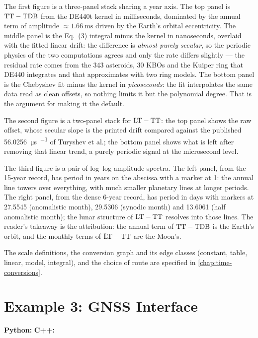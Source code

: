 The first figure is a three-panel stack sharing a year axis. The top panel is
$\mathrm{TT}-\mathrm{TDB}$ from the DE440t kernel in milliseconds, dominated by the annual term
of amplitude $\approx\SI{1.66}{\milli\second}$ driven by the Earth's orbital
eccentricity. The middle panel is the Eq.~(3) integral minus the kernel in
nanoseconds, overlaid with the fitted linear drift: the difference is
\emph{almost purely secular}, so the periodic physics of the two computations
agrees and only the rate differs slightly --- the residual rate comes from the
343 asteroids, 30 KBOs and the Kuiper ring that DE440 integrates and that
\lupnt{} approximates with two ring models. The bottom panel is the Chebyshev fit
minus the kernel in \emph{picoseconds}: the fit interpolates the same data read
as clean offsets, so nothing limits it but the polynomial degree. That is the
argument for making it the default.

The second figure is a two-panel stack for $\mathrm{LT}-\mathrm{TT}$: the top panel shows the
raw offset, whose secular slope is the printed drift compared against the
published \SI{56.0256}{\micro\second\per\dayunit} of Turyshev et al.; the bottom
panel shows what is left after removing that linear trend, a purely periodic
signal at the microsecond level.

The third figure is a pair of log--log amplitude spectra. The left panel, from
the 15-year record, has period in years on the abscissa with a marker at
\SI{1}{\yr}: the annual line towers over everything, with much smaller planetary
lines at longer periods. The right panel, from the dense 6-year record, has
period in days with markers at \SI{27.5545}{\dayunit} (anomalistic month),
\SI{29.5306}{\dayunit} (synodic month) and \SI{13.6061}{\dayunit} (half
anomalistic month); the lunar structure of $\mathrm{LT}-\mathrm{TT}$ resolves into those lines.
The reader's takeaway is the attribution: the annual term of $\mathrm{TT}-\mathrm{TDB}$ is the
Earth's orbit, and the monthly terms of $\mathrm{LT}-\mathrm{TT}$ are the Moon's.

The scale definitions, the conversion graph and its edge classes (constant,
table, linear, model, integral), and the choice of route are specified in
\cref{chap:time-conversions}.

\section{Example 3: GNSS Interface}
\label{sec:tut-ex3}

\textbf{Python:}  \quad
\textbf{C++:} 

